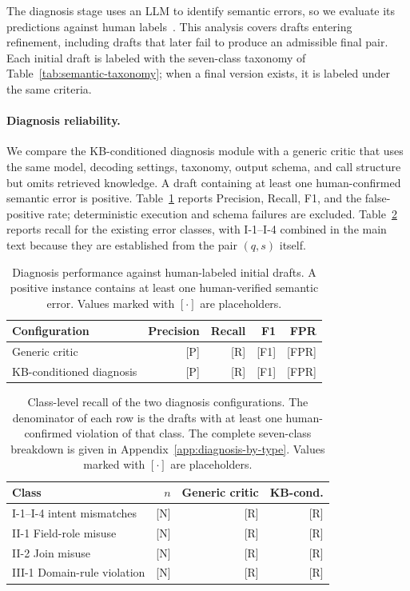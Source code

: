 \documentclass[letterpaper,journal]{IEEEtran}
\begin{document}
The diagnosis stage uses an LLM to identify semantic errors, so we evaluate its predictions against human labels~\cite{bavaresco2025judgebench}. This analysis covers drafts entering refinement, including drafts that later fail to produce an admissible final pair. Each initial draft is labeled with the seven-class taxonomy of Table~\ref{tab:semantic-taxonomy}; when a final version exists, it is labeled under the same criteria.

\paragraph{Diagnosis reliability.}
We compare the KB-conditioned diagnosis module with a generic critic that uses the same model, decoding settings, taxonomy, output schema, and call structure but omits retrieved knowledge. A draft containing at least one human-confirmed semantic error is positive. Table~\ref{tab:diagnosis-performance} reports Precision, Recall, F1, and the false-positive rate; deterministic execution and schema failures are excluded. Table~\ref{tab:recall-by-type} reports recall for the existing error classes, with I-1--I-4 combined in the main text because they are established from the pair $(q,s)$ itself.

\begin{table}[!t]
\centering
\caption{Diagnosis performance against human-labeled initial drafts. A positive instance contains at least one human-verified semantic error. Values marked with $[\cdot]$ are placeholders.}
\label{tab:diagnosis-performance}
\small
\setlength{\tabcolsep}{4pt}
\begin{tabular}{lrrrr}
\toprule
\textbf{Configuration} & \textbf{Precision} & \textbf{Recall} & \textbf{F1} & \textbf{FPR} \\
\midrule
Generic critic & [P] & [R] & [F1] & [FPR] \\
KB-conditioned diagnosis & [P] & [R] & [F1] & [FPR] \\
\bottomrule
\end{tabular}
\end{table}

\begin{table}[!t]
\centering
\caption{Class-level recall of the two diagnosis configurations. The denominator of each row is the drafts with at least one human-confirmed violation of that class. The complete seven-class breakdown is given in Appendix~\ref{app:diagnosis-by-type}. Values marked with $[\cdot]$ are placeholders.}
\label{tab:recall-by-type}
\small
\setlength{\tabcolsep}{4pt}
\begin{tabular}{lrrr}
\toprule
\textbf{Class} & \textbf{$n$} & \textbf{Generic critic} & \textbf{KB-cond.} \\
\midrule
I-1--I-4 intent mismatches & [N] & [R] & [R] \\
II-1 Field-role misuse & [N] & [R] & [R] \\
II-2 Join misuse & [N] & [R] & [R] \\
III-1 Domain-rule violation & [N] & [R] & [R] \\
\bottomrule
\end{tabular}
\end{table}
\end{document}
